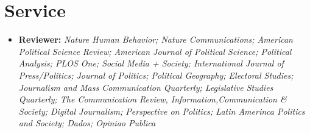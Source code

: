 \documentclass[letterpaper, 11pt]{article}
\begin{document}










\section*{Service}

    \begin{itemize}[leftmargin=.45cm]
    \item \textbf{Reviewer:} \textit{Nature Human Behavior; Nature Communications; American Political Science Review; American Journal of Political Science; Political Analysis; PLOS One; Social Media + Society; International Journal of Press/Politics; Journal of Politics; Political Geography; Electoral Studies; Journalism and Mass Communication Quarterly; Legislative Studies Quarterly; The Communication Review, Information,Communication \& Society; Digital Journalism; Perspective on Politics; Latin Amerinca Politics and Society; Dados; Opiniao Publica}
    \end{itemize}
\end{document}
